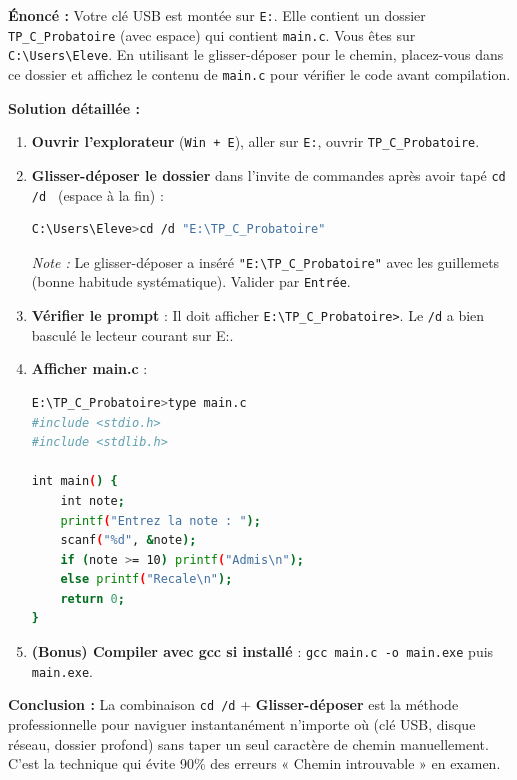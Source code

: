 \documentclass[11pt]{article}
\begin{document}
\begin{exoresolu}
\textbf{Énoncé :} Votre clé USB est montée sur \texttt{E:}. Elle contient un dossier \texttt{TP\_C\_Probatoire} (avec espace) qui contient \texttt{main.c}. Vous êtes sur \texttt{C:\textbackslash Users\textbackslash Eleve}. En utilisant le glisser-déposer pour le chemin, placez-vous dans ce dossier et affichez le contenu de \texttt{main.c} pour vérifier le code avant compilation.

\tcblower
\textbf{Solution détaillée :}

\begin{enumerate}
    \item \textbf{Ouvrir l'explorateur} (\texttt{Win + E}), aller sur \texttt{E:}, ouvrir \texttt{TP\_C\_Probatoire}.
    \item \textbf{Glisser-déposer le dossier} dans l'invite de commandes après avoir tapé \texttt{cd /d } (espace à la fin) :
    \begin{lstlisting}[language=bash]
C:\Users\Eleve>cd /d "E:\TP_C_Probatoire"
    \end{lstlisting}
    \textit{Note :} Le glisser-déposer a inséré \texttt{"E:\textbackslash TP\_C\_Probatoire"} avec les guillemets (bonne habitude systématique). Valider par \texttt{Entrée}.
    \item \textbf{Vérifier le prompt} : Il doit afficher \texttt{E:\textbackslash TP\_C\_Probatoire\textgreater}. Le \texttt{/d} a bien basculé le lecteur courant sur E:.
    \item \textbf{Afficher main.c} :
    \begin{lstlisting}[language=bash]
E:\TP_C_Probatoire>type main.c
#include <stdio.h>
#include <stdlib.h>

int main() {
    int note;
    printf("Entrez la note : ");
    scanf("%d", &note);
    if (note >= 10) printf("Admis\n");
    else printf("Recale\n");
    return 0;
}
    \end{lstlisting}
    \item \textbf{(Bonus) Compiler avec gcc si installé} : \texttt{gcc main.c -o main.exe} puis \texttt{main.exe}.
\end{enumerate}
\textbf{Conclusion :} La combinaison \texttt{cd /d} + \textbf{Glisser-déposer} est la méthode professionnelle pour naviguer instantanément n'importe où (clé USB, disque réseau, dossier profond) sans taper un seul caractère de chemin manuellement. C'est la technique qui évite 90\% des erreurs « Chemin introuvable » en examen.
\end{exoresolu}
\end{document}
